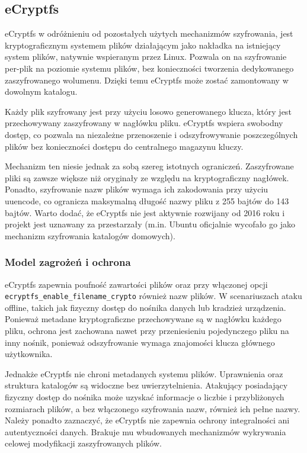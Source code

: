 \documentclass[a4paper]{article}
\begin{document}
\subsection{eCryptfs}
eCryptfs  w odróżnieniu od pozostałych użytych mechanizmów szyfrowania, jest kryptograficznym
systemem plików działającym jako nakładka na istniejący system plików, natywnie wspieranym
przez Linux. Pozwala on na szyfrowanie per-plik na poziomie systemu plików, bez konieczności
tworzenia dedykowanego zaszyfrowanego wolumenu. Dzięki temu eCryptfs może zostać zamontowany
w dowolnym katalogu.

Każdy plik szyfrowany jest przy użyciu losowo generowanego klucza, który jest przechowywany
zaszyfrowany w nagłówku pliku. eCryptfs wspiera swobodny dostęp, co pozwala na niezależne
przenoszenie i odszyfrowywanie poszczególnych plików bez konieczności dostępu do centralnego
magazynu kluczy.

Mechanizm ten niesie jednak za sobą szereg istotnych ograniczeń. Zaszyfrowane pliki są zawsze
większe niż oryginały ze względu na kryptograficzny nagłówek. Ponadto, szyfrowanie
nazw plików wymaga ich zakodowania przy użyciu uuencode, co ogranicza maksymalną długość
nazwy pliku z 255 bajtów do 143 bajtów. Warto dodać, że eCryptfs nie jest aktywnie rozwijany
od 2016 roku i projekt jest uznawany za przestarzały (m.in. Ubuntu oficjalnie wycofało go
jako mechanizm szyfrowania katalogów domowych).

\subsubsection{Model zagrożeń i ochrona}
eCryptfs zapewnia poufność zawartości plików oraz przy włączonej opcji
\texttt{ecryptfs\_enable\_filename\_crypto} również nazw plików. W scenariuszach ataku
offline, takich jak fizyczny dostęp do nośnika danych lub kradzież urządzenia.
Ponieważ metadane kryptograficzne przechowywane są w nagłówku każdego pliku, ochrona jest
zachowana nawet przy przeniesieniu pojedynczego pliku na inny nośnik, ponieważ
odszyfrowanie wymaga znajomości klucza głównego użytkownika.

Jednakże eCryptfs nie chroni metadanych systemu plików. Uprawnienia oraz struktura katalogów
są widoczne bez uwierzytelnienia. Atakujący posiadający fizyczny dostęp do nośnika może uzyskać
informacje o liczbie i przybliżonych rozmiarach plików, a bez włączonego szyfrowania nazw,
również ich pełne nazwy. Należy ponadto zaznaczyć, że eCryptfs nie zapewnia ochrony integralności
ani autentyczności danych. Brakuje mu wbudowanych mechanizmów wykrywania celowej modyfikacji
zaszyfrowanych plików.
\end{document}
